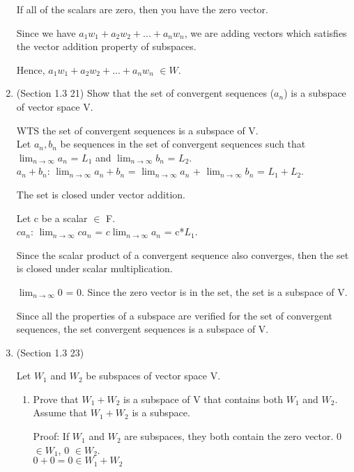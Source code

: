 \documentclass[12pt]{article}
\begin{document}
\begin{enumerate}
    If all of the scalars are zero, then you have the zero vector.

    Since we have $a_1w_1 + a_2w_2 + ... + a_nw_n$, we are adding vectors which satisfies the vector addition property of subspaces. 

    Hence, $a_1w_1 + a_2w_2 + ... + a_nw_n$ $\in W.$ \qedsymbol{}
    
    \item (Section 1.3 21)
    Show that the set of convergent sequences ($a_n$) is a subspace of vector space V.

    WTS the set of convergent sequences is a subspace of V.\\ 
    Let $a_n, b_n$ be sequences in the set of convergent sequences such that $\lim_{n\to\infty} a_n$ = $L_1$ and $\lim_{n\to\infty} b_n$ = $L_2$. \\
    
    $a_n + b_n$: $\lim_{n\to\infty} a_n + b_n$ = $\lim_{n\to\infty} a_n$ + $\lim_{n\to\infty} b_n$ = $L_1 + L_2$.

    The set is closed under vector addition. 

    Let c be a scalar $\in$ F. \\
    $ca_n$: $\lim_{n\to\infty} ca_n$ = $c\lim_{n\to\infty} a_n$ = c*$L_1$.

    Since the scalar product of a convergent sequence also converges, then the set is closed under scalar multiplication. 

    $\lim_{n\to\infty} 0$ = 0.
    Since the zero vector is in the set, the set is a subspace of V. 

    Since all the properties of a subspace are verified for the set of convergent sequences, the set convergent sequences is a subspace of V. \qedsymbol{} 
    
    \item (Section 1.3 23)

    Let $W_1$ and $W_2$ be subspaces of vector space V.
    \begin{enumerate}[label=(\alph*)]
        \item Prove that $W_1 + W_2$ is a subspace of V that contains both $W_1$ and $W_2$. \\
        Assume that $W_1 + W_2$ is a subspace. 
        
        Proof: If $W_1$ and $W_2$ are subspaces, they both contain the zero vector. 0 $\in W_1$, 0 $\in W_2$. \\
        $0 + 0 = 0 \in W_1 + W_2$


\end{enumerate}
\end{enumerate}
\end{document}
